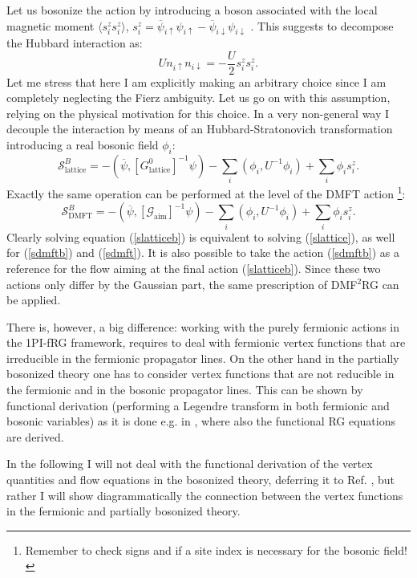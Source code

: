\documentclass[a4paper,11pt]{article}
\begin{document}
Let us bosonize the action by introducing a boson associated with the local magnetic moment $\langle s^z_i s^z_i \rangle$, $s^z_i = \overline \psi_{i\uparrow}\psi_{i\uparrow}-\overline \psi_{i\downarrow}\psi_{i\downarrow}$ . 
This suggests to decompose the Hubbard interaction as: 
\begin{equation}
Un_{i\uparrow}n_{i\downarrow}=-\frac{U}{2}s^z_i s^z_i.  
\end{equation}   
Let me stress that here I am explicitly making an arbitrary choice since I am completely neglecting the Fierz ambiguity\cite{Baier2004}. 
Let us go on with this assumption, relying on the physical motivation for this choice.
In a very non-general way I decouple the interaction by means of an Hubbard-Stratonovich transformation introducing a real bosonic field $\phi_i$: 
\begin{equation}
\label{slatticeb}
\mathcal{S}^B_{\mathrm{lattice}}= -(\overline \psi, [G^0_{\mathrm{lattice}}]^{-1}\psi)-\sum_i(\phi_i,U^{-1}\phi_i)+\sum_i \phi_i s^z_i.
\end{equation}  
Exactly the same operation can be performed at the level of the DMFT action
\footnote{Remember to check signs and if a site index is necessary for the bosonic field!}: 
\begin{equation}
\label{sdmftb}
\mathcal{S}^B_{\mathrm{DMFT}} = -(\overline \psi, [\mathcal{G}_{\mathrm{aim}}]^{-1}\psi)-\sum_i(\phi_i,U^{-1}\phi_i)+\sum_i \phi_i s^z_i.
\end{equation} 
Clearly solving equation (\ref{slatticeb}) is equivalent to solving (\ref{slattice}), as well for (\ref{sdmftb}) and (\ref{sdmft}). 
It is also possible to take the action (\ref{sdmftb}) as a reference for the flow aiming at the final action (\ref{slatticeb}). Since these two actions only differ by the Gaussian part, the same prescription of DMF$^2$RG \cite{Taranto2014} can be applied. 

There is, however, a big difference: working with the purely fermionic actions in the 1PI-fRG framework, requires to deal with fermionic vertex functions that are irreducible in the fermionic propagator lines. On the other hand in the partially bosonized theory one has to consider vertex functions that are not reducible in the fermionic and in the bosonic propagator lines. This can be shown by functional derivation (performing a Legendre transform in both fermionic and bosonic variables) as it is done e.g. in \cite{Schuetz2004}, where also the functional RG equations are derived. 

In the following I will not deal with the functional derivation of the vertex quantities and flow equations in the bosonized theory, deferring it to Ref. \cite{Schuetz2004}, but rather I will show diagrammatically the connection between the vertex functions in the fermionic and partially bosonized theory. 
\end{document}
